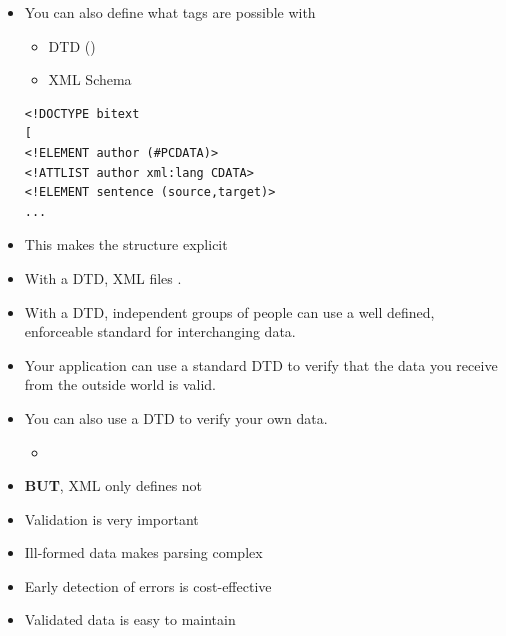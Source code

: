 \documentclass[a4paper,landscape,headrule,footrule,xetex]{foils}
\begin{document}

\begin{itemize}
\item You can also define what tags are possible with 
  \begin{itemize}
  \item DTD ()
  \item XML Schema
  \end{itemize}
\begin{verbatim}
<!DOCTYPE bitext
[
<!ELEMENT author (#PCDATA)>
<!ATTLIST author xml:lang CDATA>
<!ELEMENT sentence (source,target)>
...
\end{verbatim}
\item This makes the structure explicit
\end{itemize}

\begin{itemize}
\item With a DTD, XML files .
\item With a DTD, independent groups of people can use a well defined, enforceable standard  for interchanging data.
\item Your application can use a standard DTD to verify that the data you receive from the outside world is valid.
\item You can also use a DTD to verify your own data.
  \begin{itemize}
  \item {}
  \end{itemize}
\item \textbf{BUT}, XML only defines  not 
\end{itemize}


\begin{itemize}
\item Validation is very important
\item Ill-formed data makes parsing complex
\item Early detection of errors is cost-effective
\item Validated data is easy to maintain
\end{itemize}

\end{document}
